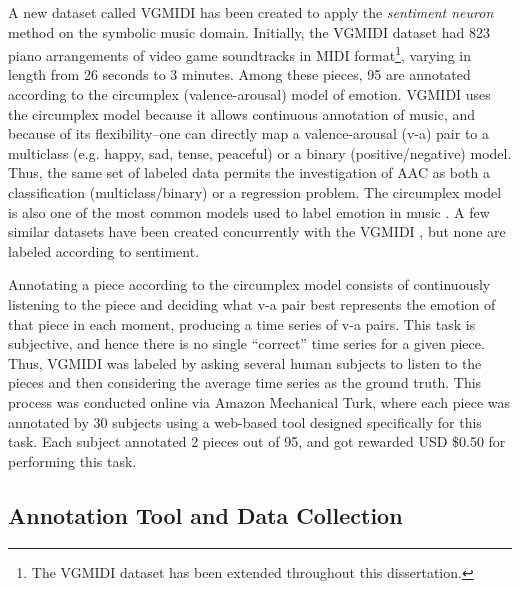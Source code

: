 A new dataset called VGMIDI has been created to apply the \textit{sentiment neuron} \cite{radford_2017} method on the symbolic music domain. Initially, the VGMIDI dataset had 823 piano arrangements of video game soundtracks in MIDI format\footnote{The VGMIDI dataset has been extended throughout this dissertation.}, varying in length from 26 seconds to 3 minutes.
Among these pieces, 95 are annotated according to the circumplex (valence-arousal) model of emotion. VGMIDI uses the circumplex model because it allows continuous annotation of music, and because of its flexibility--one can directly map a valence-arousal  (v-a) pair to a multiclass (e.g. happy, sad, tense, peaceful) or a binary (positive/negative) model. Thus, the same set of labeled data permits the investigation of AAC as both a classification (multiclass/binary) or a regression problem. The circumplex model is also one of the most common models used to label emotion in music \cite{Soleymani_2013}. A few similar datasets have been created concurrently with the VGMIDI \cite{madhok2018sentimozart, tan2020automated, zhao2019emotional}, but none are labeled according to sentiment.

Annotating a piece according to the circumplex model consists of continuously listening to the piece and deciding what v-a pair best represents the emotion of that piece in each moment, producing a time series of v-a pairs. This task is subjective, and hence there is no single ``correct'' time series for a given piece. Thus, VGMIDI was labeled by asking several human subjects to listen to the pieces and then considering the average time series as the ground truth. This process was conducted online via Amazon Mechanical Turk, where each piece was annotated by 30 subjects using a web-based tool designed specifically for this task. Each subject annotated 2 pieces out of 95, and got rewarded USD \$0.50 for performing this task.

\subsection{Annotation Tool and Data Collection}
\label{sec:data_collection}

